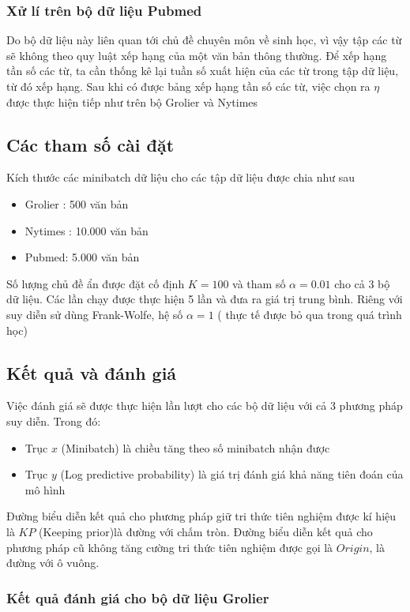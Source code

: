 \documentclass[fontsize=13pt]{scrartcl}
\begin{document}
\subsubsection{Xử lí trên bộ dữ liệu Pubmed}
Do bộ dữ liệu này liên quan tới chủ đề chuyên môn về sinh học, vì vậy tập các từ sẽ không theo quy luật xếp hạng của một văn bản thông thường. Để xếp hạng tần số các từ, ta cần thống kê lại tuần số xuất hiện của các từ trong tập dữ liệu, từ đó xếp hạng.
Sau khi có được bảng xếp hạng tần số các từ, việc chọn ra $\eta$ được thực hiện tiếp như trên bộ Grolier và Nytimes
\subsection{Các tham số cài đặt}
Kích thước các minibatch dữ liệu cho các tập dữ liệu được chia như sau
\begin{itemize}
\item Grolier : 500 văn bản
\item Nytimes : 10.000 văn bản
\item Pubmed: 5.000 văn bản
\end{itemize}
Số lượng chủ đề ẩn được đặt cố định $K = 100$ và tham số $\alpha = 0.01$  cho cả 3 bộ dữ liệu. Các lần chạy được thực hiện 5 lần và đưa ra giá trị trung bình. Riêng với suy diễn sử dùng Frank-Wolfe, hệ số $\alpha = 1$ ( thực tế được bỏ qua trong quá trình học)
\subsection{Kết quả và đánh giá}
Việc đánh giá sẽ được thực hiện lần lượt cho các bộ dữ liệu với cả 3 phương pháp suy diễn. Trong đó:
\begin{itemize}
\item Trục $x$ (Minibatch) là chiều tăng theo số minibatch nhận được
\item Trục $y$ (Log predictive probability) là giá trị đánh giá khả năng tiên đoán của mô hình
\end{itemize}
Đường biểu diễn kết quả cho phương pháp giữ tri thức tiên nghiệm được kí hiệu là $KP$ (Keeping prior)là đường với chấm tròn. Đường biểu diễn kết quả cho phương pháp cũ không tăng cường tri thức tiên nghiệm được gọi là $Origin$, là đường với ô vuông.
\newpage
\subsubsection{Kết quả đánh giá cho bộ dữ liệu Grolier}
\end{document}
